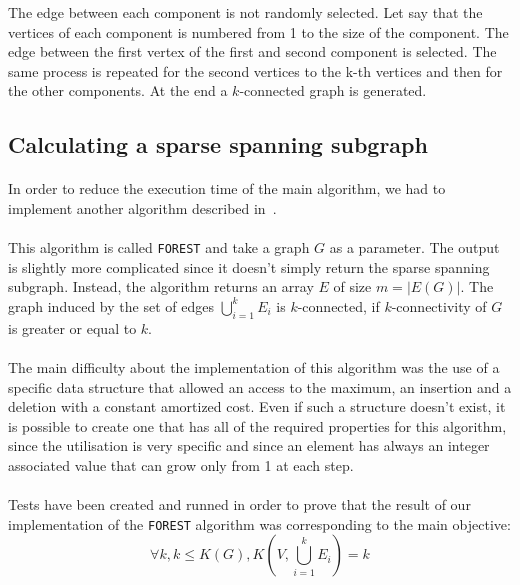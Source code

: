 The edge between each component is not randomly selected. Let say that the vertices
of each component is numbered from 1 to the size of the component. The edge between 
the first vertex of the first and second component is selected. The same process is 
repeated for the second vertices to the k-th vertices and then for the other 
components. At the end a $k$-connected graph is generated. 


 
\subsection{Calculating a sparse spanning subgraph}
\paragraph{}
In order to reduce the execution time of the main algorithm, we had to
implement another algorithm described in~\cite{NaIb92}.

\paragraph{}
This algorithm is called \verb!FOREST! and take a graph $G$ as a parameter. The
output is slightly more complicated since it doesn't simply return the
sparse spanning subgraph. Instead, the algorithm returns an array $E$ of size
$m = |E(G)|$. The graph induced by the set of edges $\bigcup \limits_{i=1}^k E_i$
is $k$-connected, if $k$-connectivity of $G$ is greater or equal to $k$.

\paragraph{}
The main difficulty about the implementation of this algorithm was the use of a
specific data structure that allowed an access to the maximum, an insertion and
a deletion with a constant amortized cost. Even if such a structure doesn't
exist, it is possible to create one that has all of the required properties for
this algorithm, since the utilisation is very specific and since an element has
always an integer associated value that can grow only from 1 at each step.


\paragraph{}
Tests have been created and runned in order to prove that the result of our
implementation of the \verb!FOREST! algorithm was corresponding to the main
objective:
$$\forall k, k \leq K(G),K(V,\bigcup \limits_{i=1}^k E_i) = k$$

